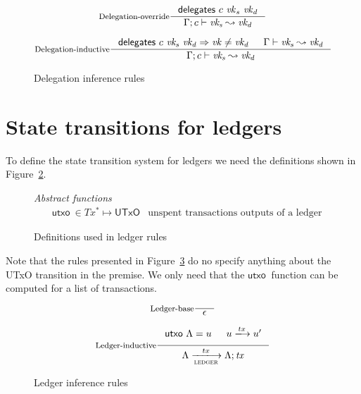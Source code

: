 \documentclass[11pt,a4paper]{article}
\newcommand{\var}[1]{\mathit{#1}}
\newcommand{\fun}[1]{\mathsf{#1}}
\newcommand{\type}[1]{\mathsf{#1}}
\newcommand{\trans}[2]{\xlongrightarrow[\textsc{#1}]{#2}}
\newcommand{\seqof}[1]{#1^{*}}
\newcommand{\ldelegates}[3]{#1 \vdash #2 \leadsto #3}
\newcommand{\UTxO}{\type{UTxO}}
\newcommand{\utxo}[1]{\fun{utxo}\ #1}
\newcommand{\delegatesName}{\fun{delegates}}
\newcommand{\delegates}[3]{\delegatesName~#1~#2~#3}
\begin{document}
\begin{figure}[h]
  \begin{equation}\label{eq:delegation-override}
    \inference[Delegation-override]
    {\delegates{c}{\var{vk}_s}{\var{vk}_d}}
    {\ldelegates{\Gamma; c}{\var{vk_s}}{\var{vk_d}}}
  \end{equation}

  \begin{equation}\label{eq:delegation-inductive}
    \inference[Delegation-inductive]
    {\delegates{c}{\var{vk_s}}{\var{vk_d}} \Rightarrow \var{vk} \neq \var{vk_d}
      & \ldelegates{\Gamma}{\var{vk_s}}{\var{vk_d}}
    }
    {\ldelegates{\Gamma; c}{\var{vk_s}}{\var{vk_d}}}
  \end{equation}

  \caption{Delegation inference rules}
  \label{fig:state-trans-delegation}
\end{figure}
\section{State transitions for ledgers}
\label{sec:state-trans-ledg}

To define the state transition system for ledgers we need the definitions
shown in Figure~\ref{fig:ledger-rules-defs}.

\begin{figure}[h]
  \emph{Abstract functions}
  \begin{align*}
    & \utxo{} \in \seqof{Tx} \mapsto \UTxO
      & \text{unspent transactions outputs of a ledger}
  \end{align*}
  \caption{Definitions used in ledger rules}
  \label{fig:ledger-rules-defs}
\end{figure}

Note that the rules presented in Figure~\ref{fig:ledger-rules} do no specify
anything about the UTxO transition in the premise. We only need that the
$\utxo{}$ function can be computed for a list of transactions.

\begin{figure}[h]
  \begin{equation}
    \label{eq:ledger-base}
    \inference[Ledger-base]
    {}
    {\epsilon}
  \end{equation}

  \begin{equation}
    \label{eq:ledger-indutive}
    \inference[Ledger-inductive]
    {\utxo{\Lambda} = u & u \trans{}{tx} u' }
    {\Lambda \trans{ledger}{tx}{\Lambda; \var{tx}}}
  \end{equation}
  \caption{Ledger inference rules}
  \label{fig:ledger-rules}
\end{figure}
\end{document}

